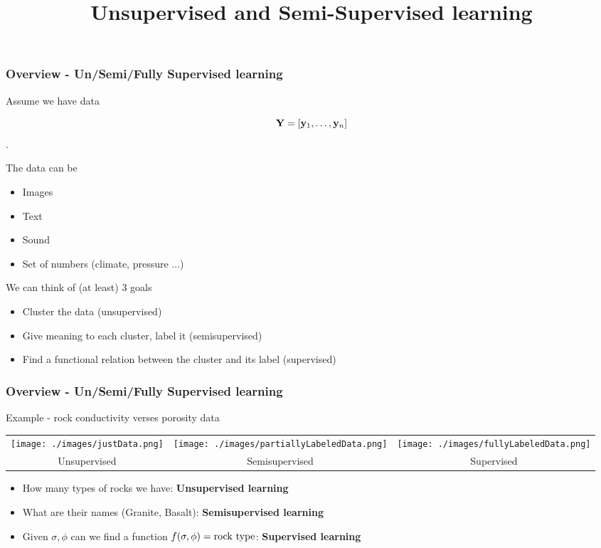 \documentclass[12pt,fleqn]{beamer}
\title{Unsupervised and Semi-Supervised learning}
\date{}
\begin{document}
\makebeamertitle



\begin{frame}
\frametitle{Overview - Un/Semi/Fully Supervised learning}


Assume we have data 
  
$${\bf Y} = [{\bf y}_1, \ldots, {\bf y}_n]$$.

The data can be
\begin{itemize}
\item Images
\item Text
\item Sound
\item Set of numbers (climate, pressure ...)
\end{itemize}

\bigskip

We can think of (at least) 3 goals
\begin{itemize}
\item Cluster the data (unsupervised)
\item Give meaning to each cluster, label it (semisupervised)
\item Find a functional relation between the cluster and its label (supervised)
\end{itemize}

\end{frame}

\begin{frame}
\frametitle{Overview - Un/Semi/Fully Supervised learning}

Example - rock conductivity verses porosity data
\begin{center}
\begin{tabular}{ccc}
\texttt{[image: ./images/justData.png]} &
\texttt{[image: ./images/partiallyLabeledData.png]} &
\texttt{[image: ./images/fullyLabeledData.png]} \\
Unsupervised & Semisupervised & Supervised
\end{tabular}
\end{center}

\begin{itemize}
\item How many types of rocks we have: {\bf Unsupervised learning}
\item What are their names (Granite, Basalt): {\bf Semisupervised learning}
\item Given $\sigma, \phi$ can we find a function $f(\sigma,\phi) = {\rm rock\ type}$: {\bf Supervised learning}
\end{itemize}


\end{frame}
\end{document}
